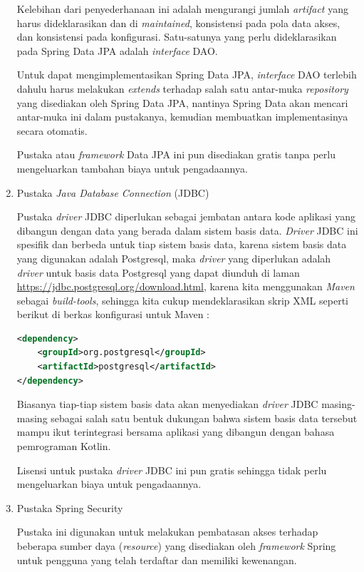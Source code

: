 \documentclass[pdftex,12pt, oneside]{article}
\begin{document}
\begin{enumerate}
Kelebihan dari penyederhanaan ini adalah mengurangi jumlah \textit{artifact} yang harus dideklarasikan dan di \textit{maintained}, konsistensi pada pola data akses, dan konsistensi pada konfigurasi. Satu-satunya yang perlu dideklarasikan pada Spring Data JPA adalah \textit{interface} DAO.

Untuk dapat mengimplementasikan Spring Data JPA, \textit{interface} DAO terlebih dahulu harus melakukan \textit{extends} terhadap salah satu antar-muka \textit{repository} yang disediakan oleh Spring Data JPA, nantinya Spring Data akan mencari antar-muka ini dalam pustakanya, kemudian membuatkan implementasinya secara otomatis.

Pustaka atau \textit{framework} Data JPA ini pun disediakan gratis tanpa perlu mengeluarkan tambahan biaya untuk pengadaannya.

	\item Pustaka \textit{Java Database Connection} (JDBC)
	
Pustaka \textit{driver} JDBC diperlukan sebagai jembatan antara kode aplikasi yang dibangun dengan data yang berada dalam sistem basis data. \textit{Driver} JDBC ini spesifik dan berbeda untuk tiap sistem basis data, karena sistem basis data yang digunakan adalah Postgresql, maka \textit{driver} yang diperlukan adalah \textit{driver} untuk basis data Postgresql yang dapat diunduh di laman \href{https://jdbc.postgresql.org/download.html}{https://jdbc.postgresql.org/download.html}, karena kita menggunakan \textit{Maven} sebagai \textit{build-tools}, sehingga kita cukup mendeklarasikan skrip XML seperti berikut di berkas konfigurasi untuk Maven :

\begin{lstlisting}[language=XML]
<dependency>
	<groupId>org.postgresql</groupId>
	<artifactId>postgresql</artifactId>
</dependency>\end{lstlisting}	

Biasanya tiap-tiap sistem basis data akan menyediakan \textit{driver} JDBC masing-masing sebagai salah satu bentuk dukungan bahwa sistem basis data tersebut mampu ikut terintegrasi bersama aplikasi yang dibangun dengan bahasa pemrograman Kotlin.

Lisensi untuk pustaka \textit{driver} JDBC ini pun gratis sehingga tidak perlu mengeluarkan biaya untuk pengadaannya.

	\item Pustaka Spring Security
	
	Pustaka ini digunakan untuk melakukan pembatasan akses terhadap beberapa sumber daya (\textit{resource}) yang disediakan oleh \textit{framework} Spring untuk pengguna yang telah terdaftar dan memiliki kewenangan.
	

\end{enumerate}
\end{document}
